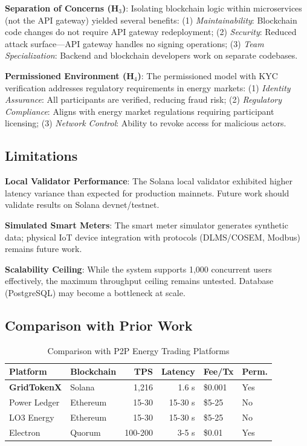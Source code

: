 \documentclass[conference]{IEEEtran}
\begin{document}
\textbf{Separation of Concerns (H$_3$)}: Isolating blockchain logic within microservices (not the API gateway) yielded several benefits: (1) \textit{Maintainability}: Blockchain code changes do not require API gateway redeployment; (2) \textit{Security}: Reduced attack surface---API gateway handles no signing operations; (3) \textit{Team Specialization}: Backend and blockchain developers work on separate codebases.

\textbf{Permissioned Environment (H$_4$)}: The permissioned model with KYC verification addresses regulatory requirements in energy markets: (1) \textit{Identity Assurance}: All participants are verified, reducing fraud risk; (2) \textit{Regulatory Compliance}: Aligns with energy market regulations requiring participant licensing; (3) \textit{Network Control}: Ability to revoke access for malicious actors.

\subsection{Limitations}

\textbf{Local Validator Performance}: The Solana local validator exhibited higher latency variance than expected for production mainnets. Future work should validate results on Solana devnet/testnet.

\textbf{Simulated Smart Meters}: The smart meter simulator generates synthetic data; physical IoT device integration with protocols (DLMS/COSEM, Modbus) remains future work.

\textbf{Scalability Ceiling}: While the system supports 1,000 concurrent users effectively, the maximum throughput ceiling remains untested. Database (PostgreSQL) may become a bottleneck at scale.

\subsection{Comparison with Prior Work}

\begin{table}[htbp]
\caption{Comparison with P2P Energy Trading Platforms}
\begin{center}
\begin{tabular}{l l r r l l}
\toprule
\textbf{Platform} & \textbf{Blockchain} & \textbf{TPS} & \textbf{Latency} & \textbf{Fee/Tx} & \textbf{Perm.} \\
\midrule
\textbf{GridTokenX} & Solana & 1,216 & 1.6 s & \$0.001 & Yes \\
Power Ledger \cite{powerledger2017} & Ethereum & 15-30 & 15-30 s & \$5-25 & No \\
LO3 Energy \cite{lo3energy2016} & Ethereum & 15-30 & 15-30 s & \$5-25 & No \\
Electron \cite{electron2018} & Quorum & 100-200 & 3-5 s & \$0.01 & Yes \\
\bottomrule
\end{tabular}
\label{tab:comparison}
\end{center}
\end{table}
\end{document}
